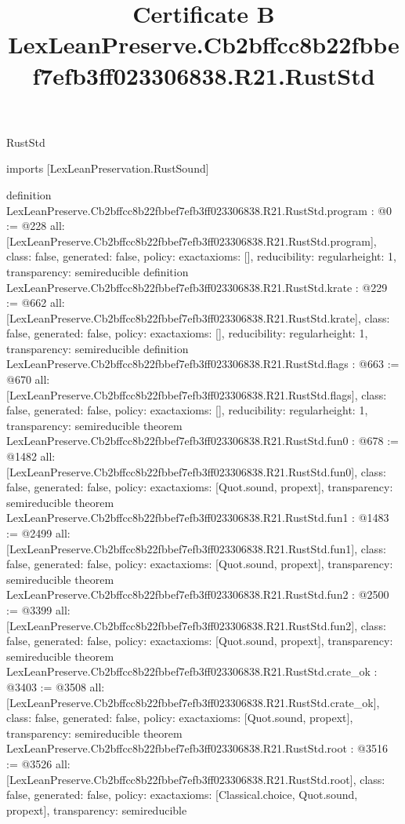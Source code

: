 \begin{lexlean}{RustStd}
\title{Certificate B LexLeanPreserve.Cb2bffcc8b22fbbef7efb3ff023306838.R21.RustStd}
\begin{coremodule}
imports [LexLeanPreservation.RustSound]

definition LexLeanPreserve.Cb2bffcc8b22fbbef7efb3ff023306838.R21.RustStd.program : @0 := @228 {
  all: [LexLeanPreserve.Cb2bffcc8b22fbbef7efb3ff023306838.R21.RustStd.program],
  class: false,
  generated: false,
  policy: exact{axioms: []},
  reducibility: regular{height: 1},
  transparency: semireducible
}
definition LexLeanPreserve.Cb2bffcc8b22fbbef7efb3ff023306838.R21.RustStd.krate : @229 := @662 {
  all: [LexLeanPreserve.Cb2bffcc8b22fbbef7efb3ff023306838.R21.RustStd.krate],
  class: false,
  generated: false,
  policy: exact{axioms: []},
  reducibility: regular{height: 1},
  transparency: semireducible
}
definition LexLeanPreserve.Cb2bffcc8b22fbbef7efb3ff023306838.R21.RustStd.flags : @663 := @670 {
  all: [LexLeanPreserve.Cb2bffcc8b22fbbef7efb3ff023306838.R21.RustStd.flags],
  class: false,
  generated: false,
  policy: exact{axioms: []},
  reducibility: regular{height: 1},
  transparency: semireducible
}
theorem LexLeanPreserve.Cb2bffcc8b22fbbef7efb3ff023306838.R21.RustStd.fun0 : @678 := @1482 {
  all: [LexLeanPreserve.Cb2bffcc8b22fbbef7efb3ff023306838.R21.RustStd.fun0],
  class: false,
  generated: false,
  policy: exact{axioms: [Quot.sound, propext]},
  transparency: semireducible
}
theorem LexLeanPreserve.Cb2bffcc8b22fbbef7efb3ff023306838.R21.RustStd.fun1 : @1483 := @2499 {
  all: [LexLeanPreserve.Cb2bffcc8b22fbbef7efb3ff023306838.R21.RustStd.fun1],
  class: false,
  generated: false,
  policy: exact{axioms: [Quot.sound, propext]},
  transparency: semireducible
}
theorem LexLeanPreserve.Cb2bffcc8b22fbbef7efb3ff023306838.R21.RustStd.fun2 : @2500 := @3399 {
  all: [LexLeanPreserve.Cb2bffcc8b22fbbef7efb3ff023306838.R21.RustStd.fun2],
  class: false,
  generated: false,
  policy: exact{axioms: [Quot.sound, propext]},
  transparency: semireducible
}
theorem LexLeanPreserve.Cb2bffcc8b22fbbef7efb3ff023306838.R21.RustStd.crate_ok : @3403 := @3508 {
  all: [LexLeanPreserve.Cb2bffcc8b22fbbef7efb3ff023306838.R21.RustStd.crate_ok],
  class: false,
  generated: false,
  policy: exact{axioms: [Quot.sound, propext]},
  transparency: semireducible
}
theorem LexLeanPreserve.Cb2bffcc8b22fbbef7efb3ff023306838.R21.RustStd.root : @3516 := @3526 {
  all: [LexLeanPreserve.Cb2bffcc8b22fbbef7efb3ff023306838.R21.RustStd.root],
  class: false,
  generated: false,
  policy: exact{axioms: [Classical.choice, Quot.sound, propext]},
  transparency: semireducible
}


\end{coremodule}
\end{lexlean}
